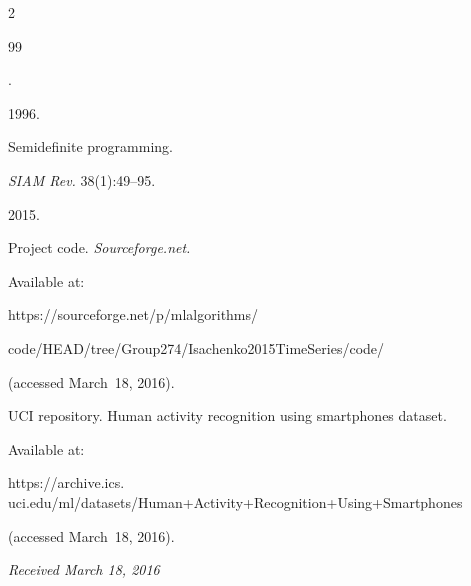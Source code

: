\begin{multicols}{2}
{{\begin{thebibliography}{99}


.


1996.


Semidefinite programming.


\textit{SIAM Rev.} 38(1):49--95.







 2015.


Project code. \textit{Sourceforge.net.} 


Available at:


{\sf https://sourceforge.net/p/mlalgorithms/\linebreak 


code/HEAD/tree/Group274/Isachenko2015TimeSeries\linebreak /code/}


(accessed March~18, 2016).







UCI repository. Human activity recognition using smartphones dataset.


Available at:


{\sf https://archive.ics. uci.edu/ml/datasets/Human+Activity+Recognition+\linebreak Using+Smartphones}


(accessed March~18, 2016).


\end{thebibliography}





 }


 }





\end{multicols}





\vspace*{-3pt}





\hfill{\small\textit{Received March 18, 2016}}








\Contr





